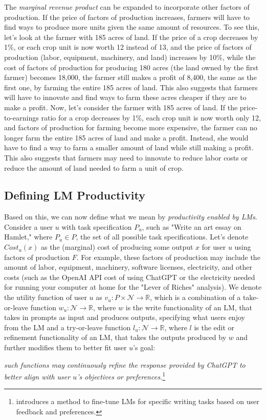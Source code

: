 {The \emph{marginal revenue product} can be expanded to incorporate other factors of production. 
If the price of factors of production increases, farmers will have to find ways to produce more units given the same amount of resources.
To see this, let's look at the farmer with 185 acres of land. 
If the price of a crop decreases by 1\%, or each crop unit is now worth 12 instead of 13, and the price of factors of production (labor, equipment, machinery, and land) increases by 10\%, while the cost of factors of production for producing 180 acres (the land owned by the first farmer) becomes 18,000, the farmer still makes a profit of 8,400, the same as the first one, by farming the entire 185 acres of land.
This also suggests that farmers will have to innovate and find ways to farm these acres cheaper if they are to make a profit.
Now, let's consider the farmer with 185 acres of land.
If the price-to-earnings ratio for a crop decreases by 1\%, each crop unit is now worth only 12, and factors of production for farming become more expensive, the farmer can no longer farm the entire 185 acres of land and make a profit.
Instead, she would have to find a way to farm a smaller amount of land while still making a profit.
This also suggests that farmers may need to innovate to reduce labor costs or reduce the amount of land needed to farm a unit of crop.

\subsection{Defining LM Productivity}

Based on this, we can now define what we mean by \emph{productivity enabled by LMs}.
Consider a user $u$ with task specification $P_u$, such as "Write an art essay on Hamlet," where $P_u \in P$, the set of all possible task specifications.
Let's denote $Cost_u(x)$ as the (marginal) cost of producing some output $x$ for user $u$ using factors of production $F$.
For example, these factors of production may include the amount of labor, equipment, machinery, software licenses, electricity, and other costs (such as the OpenAI API cost of using ChatGPT or the electricity needed for running your computer at home for the "Lever of Riches" analysis).
We denote the utility function of user $u$ as $v_u: P \times \mathcal{N} \to \mathbb{R}$, which is a combination of a take-or-leave function $w_u: \mathcal{N} \to \mathbb{R}$, where $w$ is the write functionality of an LM, that takes in prompts as input and produces outputs, specifying what users enjoy from the LM and a try-or-leave function $l_u: \mathcal{N} \to \mathbb{R}$, where $l$ is the edit or refinement functionality of an LM, that takes the outputs produced by $w$ and further modifies them to better fit user $u$'s goal:
\begin{myquotation}
    \emph{such functions may continuously refine the response provided by ChatGPT to better align with user $u$'s objectives or preferences.}\footnote{\citet{salvi2024conversational} introduces a method to fine-tune LMs for specific writing tasks based on user feedback and preferences.}
\end{myquotation}

}
